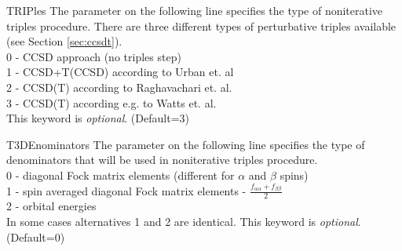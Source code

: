\begin{keywordlist}
\item[TRIPles]
The parameter on the following line specifies the
type of noniterative triples
procedure. There are three different types of perturbative triples available
(see Section \ref{sec:ccsdt}).\\
0 - CCSD approach (no triples step) \\
1 - CCSD+T(CCSD) according to Urban et. al \cite{t3_urban} \\
2 - CCSD(T) according to Raghavachari et. al. \cite{t3_ragh} \\
3 - CCSD(T) according e.g. to Watts et. al.  \cite{t3_watts}\\
This keyword is {\it optional}. (Default=3)
\item[T3DEnominators]
The parameter on the following line specifies the type of denominators that
will be used in noniterative triples procedure.\\
0 - diagonal Fock matrix elements (different for ${\alpha}$ and ${\beta}$
spins)\\
1 - spin averaged diagonal Fock matrix elements  -
${\frac{f_{\alpha\alpha}+f_{\beta\beta}}{2}}$\\
2 - orbital energies \\
In some cases alternatives 1 and 2 are identical.
This keyword is {\it optional}. (Default=0)

\end{keywordlist}
